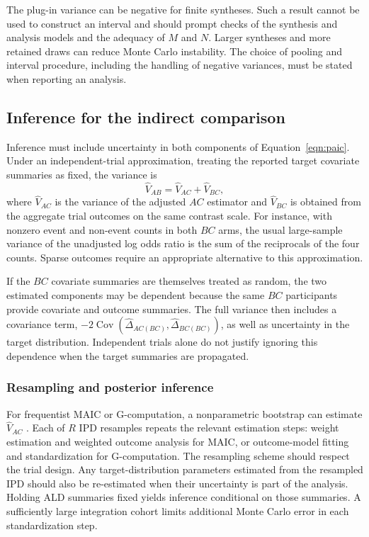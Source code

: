 \documentclass[article]{jss}
\begin{document}
The plug-in variance can be negative for finite syntheses. Such a result cannot be used to construct an interval and should prompt checks of the synthesis and analysis models and the adequacy of $M$ and $N$. Larger syntheses and more retained draws can reduce Monte Carlo instability. The choice of pooling and interval procedure, including the handling of negative variances, must be stated when reporting an analysis.

\subsection{Inference for the indirect comparison}
\label{sec:paic-inference}
Inference must include uncertainty in both components of Equation~\ref{eqn:paic}. Under an independent-trial approximation, treating the reported target covariate summaries as fixed, the variance is
\begin{equation}
\label{eqn:paic-variance}
\widehat V_{AB}=\widehat V_{AC}+\widehat V_{BC},
\end{equation}
where $\widehat V_{AC}$ is the variance of the adjusted $AC$ estimator and $\widehat V_{BC}$ is obtained from the aggregate trial outcomes on the same contrast scale. For instance, with nonzero event and non-event counts in both $BC$ arms, the usual large-sample variance of the unadjusted log odds ratio is the sum of the reciprocals of the four counts. Sparse outcomes require an appropriate alternative to this approximation.

If the $BC$ covariate summaries are themselves treated as random, the two estimated components may be dependent because the same $BC$ participants provide covariate and outcome summaries. The full variance then includes a covariance term, $-2\operatorname{Cov}(\widehat\Delta_{AC(BC)},\widehat\Delta_{BC(BC)})$, as well as uncertainty in the target distribution. Independent trials alone do not justify ignoring this dependence when the target summaries are propagated.

\subsubsection{Resampling and posterior inference}
For frequentist MAIC or G-computation, a nonparametric bootstrap can estimate $\widehat V_{AC}$ \citep{efron1979bootstrap}. Each of $R$ IPD resamples repeats the relevant estimation steps: weight estimation and weighted outcome analysis for MAIC, or outcome-model fitting and standardization for G-computation. The resampling scheme should respect the trial design. Any target-distribution parameters estimated from the resampled IPD should also be re-estimated when their uncertainty is part of the analysis. Holding ALD summaries fixed yields inference conditional on those summaries. A sufficiently large integration cohort limits additional Monte Carlo error in each standardization step.
\end{document}

